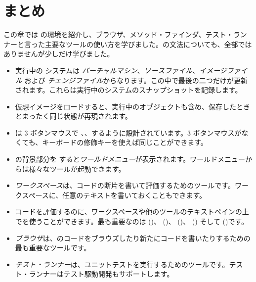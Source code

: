 \documentclass[a4paper,10pt,twoside]{book}
\begin{document}
\section{まとめ}
この章では \pharo の環境を紹介し、ブラウザ、メソッド・ファインダ、テスト・ランナーと言った主要なツールの使い方を学びました。\pharo の文法についても、全部ではありませんが少しだけ学びました。

\begin{itemize}
  \item 実行中の \pharo システムは \emph{バーチャルマシン}、\emph{ソースファイル}、\emph{イメージファイル} および \emph{チェンジファイル}からなります。この中で最後の二つだけが更新されます。これらは実行中のシステムのスナップショットを記録します。
  \item \pharo 仮想イメージをロードすると、実行中のオブジェクトも含め、保存したときとまったく同じ状態が再現されます。
  \item \pharo は 3 ボタンマウスで \click、\actclick、\metaclick するように設計されています。3 ボタンマウスがなくても、キーボードの修飾キーを使えば同じことができます。
  \item \pharo の背景部分を \click すると\emph{ワールドメニュー}が表示されます。ワールドメニューからは様々なツールが起動できます。
  \item \emph{ワークスペース}は、コードの断片を書いて評価するためのツールです。ワークスペースに、任意のテキストを書いておくこともできます。
  \item コードを評価するのに、ワークスペースや他のツールのテキストペインの上でを使うことができます。最も重要なのは  ()、 ()、 ()、 () そして  ()です。
  \item \emph{ブラウザ}は、\pharo のコードをブラウズしたり新たにコードを書いたりするための最も重要なツールです。
  \item \emph{テスト・ランナー}は、ユニットテストを実行するためのツールです。テスト・ランナーはテスト駆動開発もサポートします。
\end{itemize}

\ifx\wholebook\relax\else 
   
   
\end{document}
